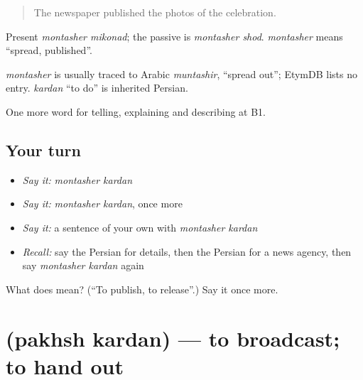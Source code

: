 \begin{quote}
The newspaper published the photos of the celebration.
\end{quote}

Present \emph{montasher mikonad}; the passive is \emph{montasher shod}. \emph{montasher} means \textquotedblleft{}spread, published\textquotedblright{}.

\begin{cousinweb}
\emph{montasher} is usually traced to Arabic \emph{muntashir}, \textquotedblleft{}spread out\textquotedblright{}; EtymDB lists no entry. \emph{kardan} \textquotedblleft{}to do\textquotedblright{} is inherited Persian.
\end{cousinweb}

\begin{grammarlens}[title={What you've built}]
One more word for telling, explaining and describing at B1.
\end{grammarlens}

\subsection*{Your turn}
\begin{itemize}
\raggedright
  \item \emph{Say it:} \emph{montasher kardan}
  \item \emph{Say it:} \emph{montasher kardan}, once more
  \item \emph{Say it:} a sentence of your own with \emph{montasher kardan}
  \item \emph{Recall:} say the Persian for details, then the Persian for a news agency, then say \emph{montasher kardan} again
\end{itemize}

\begin{tcolorbox}[breakable,colback=teal!4,colframe=teal!35!black,title={Before you move on}]
What does   mean? (\textquotedblleft{}To publish, to release\textquotedblright{}.) Say it once more.
\end{tcolorbox}
\section[\texorpdfstring{\fa{پخش} \fa{کردن} (pakhsh kardan)}{پخش کردن (pakhsh kardan)}]{  (pakhsh kardan) — to broadcast; to hand out}

\label{lesson:FA-C312-pakhsh-kardan}



